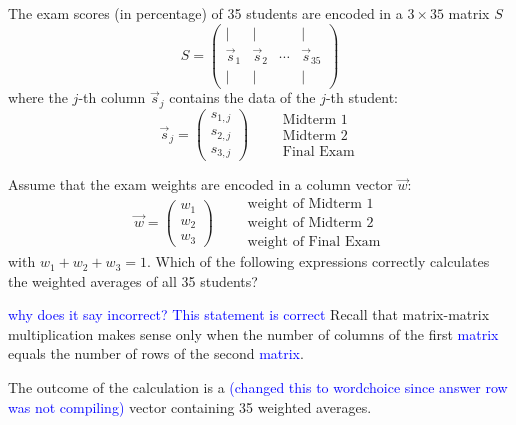 \documentclass{ximera}
\author{Tae Eun Kim}
\begin{document}
\begin{exercise}
  The exam scores (in percentage) of 35 students are encoded in a
  $3 \times 35$ matrix $S$
  \[
    S =
    \begin{pmatrix}
      |&|&&| \\
      \vec{s}_1 & \vec{s}_2 & \cdots & \vec{s}_{35} \\
      |&|&&|
    \end{pmatrix}
  \]
  where the $j$-th column $\vec{s}_j$ contains the data of the $j$-th
  student:
  \[
    \vec{s}_j =
    \begin{pmatrix}
      s_{1,j}\\ s_{2,j} \\ s_{3,j}
    \end{pmatrix}
    \qquad
    \begin{array}{l}
      \text{Midterm 1}\\
      \text{Midterm 2}\\
      \text{Final Exam}
    \end{array}
  \]

  Assume that the exam weights are encoded in a column
  vector $\vec{w}$:
  \[
    \vec{w} =
    \begin{pmatrix}
      w_1\\ w_2\\ w_3
    \end{pmatrix}
    \qquad
    \begin{array}{l}
      \text{weight of Midterm 1}\\
      \text{weight of Midterm 2}\\
      \text{weight of Final Exam}
    \end{array}
  \]
  with $w_1 + w_2 + w_3 = 1$. Which of the following expressions
  correctly calculates the weighted averages of all 35 students?
  \begin{multipleChoice}
  \end{multipleChoice}
  \begin{feedback}[incorrect]
    \textcolor{blue}{why does it say incorrect? This statement is correct} Recall that matrix-matrix multiplication makes sense only when the
    number of columns of the first \textcolor{blue}{matrix} equals the number of rows of the
    second \textcolor{blue}{matrix}.
  \end{feedback}
  \begin{prompt}
    The outcome of the calculation is a \textcolor{blue}{(changed this to wordchoice since answer row was not compiling)}  vector containing
    35 weighted averages.
  \end{prompt}
\end{exercise}
\end{document}
